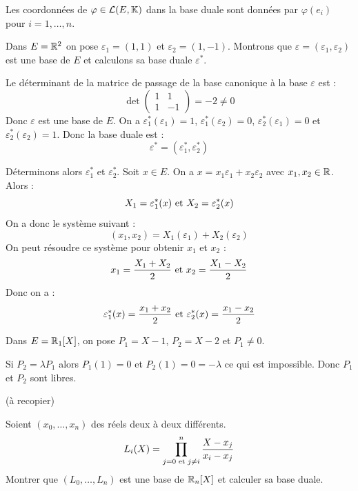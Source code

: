 \documentclass[11pt,a4paper]{report}
\begin{document}
\begin{remark}
    Les coordonnées de $\varphi \in \mathcal L(E,\mathbb{K})$ dans la base duale sont données par $\varphi(e_i)$ pour $i=1,\dots,n$.
\end{remark}

\begin{example}
    Dans $E = \mathbb{R}^2$ on pose $\varepsilon_1 = (1,1)$ et $\varepsilon_2 = (1,-1)$. Montrons que $\varepsilon = (\varepsilon_1, \varepsilon_2)$ est une base de $E$ et calculons sa base duale $\varepsilon^*$.

    Le déterminant de la matrice de passage de la base canonique à la base $\varepsilon$ est :
    $$\det\begin{pmatrix}1 & 1 \\ 1 & -1\end{pmatrix} = -2 \ne 0$$
    Donc $\varepsilon$ est une base de $E$. On a $\varepsilon_1^*(\varepsilon_1) = 1$, $\varepsilon_1^*(\varepsilon_2) = 0$, $\varepsilon_2^*(\varepsilon_1) = 0$ et $\varepsilon_2^*(\varepsilon_2) = 1$. Donc la base duale est :
    $$\varepsilon^* = (\varepsilon_1^*, \varepsilon_2^*)$$

    Déterminons alors $\varepsilon_1^*$ et $\varepsilon_2^*$. Soit $x \in E$. On a $x = x_1 \varepsilon_1 + x_2 \varepsilon_2$ avec $x_1, x_2 \in \mathbb{R}$. Alors :
    $$X_1 = \varepsilon_1^*(x) \text{ et } X_2 = \varepsilon_2^*(x)$$
    On a donc le système suivant :
    $$(x_1,x_2) = X_1(\varepsilon_1) + X_2(\varepsilon_2)$$
    On peut résoudre ce système pour obtenir $x_1$ et $x_2$ :
    $$x_1 = \frac{X_1 + X_2}{2} \text{ et } x_2 = \frac{X_1 - X_2}{2}$$
    Donc on a :
    $$\varepsilon_1^*(x) = \frac{x_1 + x_2}{2} \text{ et } \varepsilon_2^*(x) = \frac{x_1 - x_2}{2}$$
\end{example}

\begin{example}
    Dans $E = \mathbb{R}_1[X]$, on pose $P_1 = X-1$, $P_2 = X -2$ et $P_1 \ne 0$.

    Si $P_2 = \lambda P_1$ alors $P_1(1) = 0$ et $P_2(1) = 0 = -\lambda$ ce qui est impossible. Donc $P_1$ et $P_2$ sont libres.

    (à recopier)
\end{example}
\todo

\begin{exercise}
    Soient $(x_0,\dots,x_n)$ des réels deux à deux différents.
    $$L_i(X) = \prod_{j=0 \text{ et } j\ne i}^{n}\frac{X-x_j}{x_i-x_j}$$
    Montrer que $(L_0,\dots,L_n)$ est une base de $\mathbb{R}_n[X]$ et calculer sa base duale.
\end{exercise}
\end{document}
